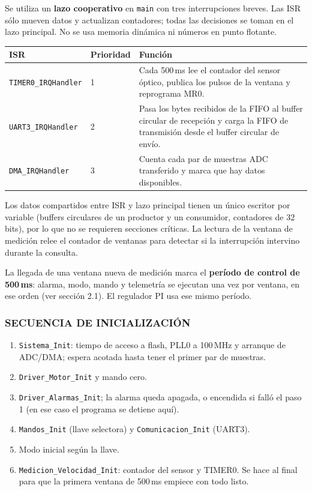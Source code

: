 Se utiliza un \textbf{lazo cooperativo} en \texttt{main} con tres interrupciones breves.
Las ISR sólo mueven datos y actualizan contadores; todas las decisiones se toman en el lazo
principal. No se usa memoria dinámica ni números en punto flotante.

\begin{longtable}{|p{3.6cm}|p{1.6cm}|p{9.4cm}|}
\hline
\textbf{ISR} & \textbf{Prioridad} & \textbf{Función} \\ \hline
\endhead
\texttt{TIMER0\_IRQHandler} & 1 & Cada 500\,ms lee el contador del sensor óptico, publica
los pulsos de la ventana y reprograma MR0. \\ \hline
\texttt{UART3\_IRQHandler} & 2 & Pasa los bytes recibidos de la FIFO al buffer circular de
recepción y carga la FIFO de transmisión desde el buffer circular de envío. \\ \hline
\texttt{DMA\_IRQHandler} & 3 & Cuenta cada par de muestras ADC transferido y marca que
hay datos disponibles. \\ \hline
\end{longtable}

Los datos compartidos entre ISR y lazo principal tienen un único escritor por variable
(buffers circulares de un productor y un consumidor, contadores de 32 bits), por lo que no
se requieren secciones críticas. La lectura de la ventana de medición relee el contador de
ventanas para detectar si la interrupción intervino durante la consulta.

La llegada de una ventana nueva de medición marca el \textbf{período de control de
500\,ms}: alarma, modo, mando y telemetría se ejecutan una vez por ventana, en ese orden
(ver sección 2.1). El regulador PI usa ese mismo período.

\subsubsection{SECUENCIA DE INICIALIZACIÓN}

\begin{enumerate}
  \item \texttt{Sistema\_Init}: tiempo de acceso a flash, PLL0 a 100\,MHz y arranque de
  ADC/DMA; espera acotada hasta tener el primer par de muestras.
  \item \texttt{Driver\_Motor\_Init} y mando cero.
  \item \texttt{Driver\_Alarmas\_Init}; la alarma queda apagada, o encendida si falló el
  paso 1 (en ese caso el programa se detiene aquí).
  \item \texttt{Mandos\_Init} (llave selectora) y \texttt{Comunicacion\_Init} (UART3).
  \item Modo inicial según la llave.
  \item \texttt{Medicion\_Velocidad\_Init}: contador del sensor y TIMER0. Se hace al
  final para que la primera ventana de 500\,ms empiece con todo listo.
\end{enumerate}

